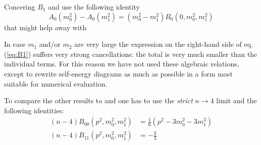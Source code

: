Concering $B_1$ \cite{Passarino:1978jh} and \LoopTools{} use the following identity
\begin{equation}
A_0(m_0^2)-A_0(m_1^2)=(m_0^2-m_1^2)B_0(0,m_0^2,m_1^2)
\end{equation}
that might help away with
\begin{displayquote}
In case $m_1$ and/or $m_2$ are very large the expression on the right-hand side of eq. (\ref{eq:B1}) suffers very strong cancellations: the total is very much smaller than the individual terms. For this reason we have not used these algebraic relations, except to rewrite self-energy diagrams as much as possible in a form most suitable for numerical evaluation.
\end{displayquote}

To compare the other results to \cite{Passarino:1978jh} and \LoopTools{} one has to use the \textit{strict} $n\rightarrow 4$ limit and the following identities\cite{Denner:2005nn}:
\begin{align}
(n-4) B_{00}(p^2,m_0^2,m_1^2) &= \frac 1 6 (p^2-3m_0^2-3m_1^2)\\
(n-4) B_{11}(p^2,m_0^2,m_1^2) &= -\frac 2 3
\end{align}
